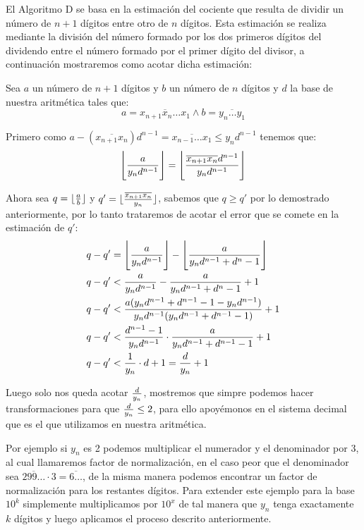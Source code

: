 \documentclass[a4paper,10pt,twocolumn]{article}
\begin{document}
El Algoritmo D se basa en la estimación del cociente que resulta de dividir un número de $n+1$ dígitos entre otro de $n$ dígitos. Esta estimación se realiza mediante la división del número formado por los dos primeros dígitos del dividendo entre el número formado por el primer dígito del divisor, a continuación mostraremos como acotar dicha estimación:

Sea $a$ un número de $n+1$ dígitos y $b$ un número de $n$ dígitos y $d$ la base de nuestra aritmética tales que:
$$a=\overline{x_{n+1}x_n\ldots x_1} \wedge b=\overline{y_n\ldots y_1}$$

Primero como $a-(\overline{x_{n+1}x_n}) d^{n-1}= \overline{x_{n-1}\ldots x_1}\leq y_n d^{n-1}$ tenemos que:
\begin{equation}
	\Bigg\lfloor{a \over y_nd^{n-1}}\Bigg\rfloor = \Bigg\lfloor{\overline{x_{n+1}x_n} d^{n-1} \over y_n d^{n-1}}\Bigg\rfloor
\end{equation}

Ahora sea $q=\lfloor{a \over b}\rfloor$ y $q'=\lfloor{\overline{x_{n+1}x_n} \over y_n}\rfloor$, sabemos que $q\geq q'$ por lo demostrado anteriormente, por lo tanto trataremos de acotar el error que se comete en la estimación de $q'$:
\begin{equation}
	\begin{split}
		&q-q'=\Bigg\lfloor{a \over y_n d^{n-1}}\Bigg\rfloor-\Bigg\lfloor{a \over y_n d^{n-1}+d^n-1}\Bigg\rfloor\\ 
		&q-q'<{a \over y_n d^{n-1}}-{a \over y_n d^{n-1}+d^n-1}+1\\
		&q-q'<{a(y_n d^{n-1}+d^{n-1}-1-y_n d^{n-1})\over y_n d^{n-1}(y_n d^{n-1}+d^{n-1}-1)}+1\\
		&q-q'<{d^{n-1}-1\over y_n d^{n-1}}\cdot {a
		\over y_n d^{n-1}+d^{n-1}-1}+1\\
		&q-q'<{1\over y_n}\cdot d+1={d\over y_n}+1
	\end{split}
\end{equation}

Luego solo nos queda acotar ${d\over y_n}$, mostremos que simpre podemos hacer transformaciones para que ${d\over y_n}\leq 2$, para ello apoyémonos en el sistema decimal que es el que utilizamos en nuestra aritmética. 

Por ejemplo si $y_n$ es 2 podemos multiplicar el numerador y el denominador por 3, al cual llamaremos factor de normalización, en el caso peor que el denominador sea $\overline{299\ldots} \cdot 3= \overline{6\ldots }$, de la misma manera podemos encontrar un factor de normalización para los restantes dígitos. Para extender este ejemplo para la base $10^k$ simplemente multiplicamos por $10^x$ de tal manera que $y_n$ tenga exactamente $k$ dígitos y luego aplicamos el proceso descrito anteriormente.
\end{document}
